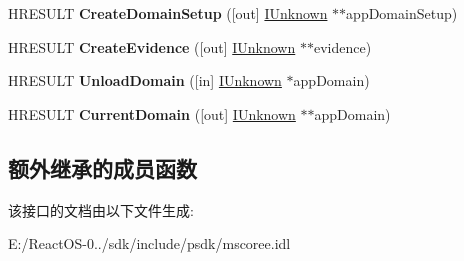 \begin{DoxyCompactItemize}
\item 
\mbox{\label{interface_i_cor_runtime_host_a9a3b87daafd1550ec6ad57dce939aab0}} 
H\+R\+E\+S\+U\+LT {\bfseries Create\+Domain\+Setup} (\mbox{[}out\mbox{]} \hyperlink{interface_i_unknown}{I\+Unknown} $\ast$$\ast$app\+Domain\+Setup)
\item 
\mbox{\label{interface_i_cor_runtime_host_a3a29d090136063897458db963f31489a}} 
H\+R\+E\+S\+U\+LT {\bfseries Create\+Evidence} (\mbox{[}out\mbox{]} \hyperlink{interface_i_unknown}{I\+Unknown} $\ast$$\ast$evidence)
\item 
\mbox{\label{interface_i_cor_runtime_host_ab30887d02569c83ae825a952adeb8304}} 
H\+R\+E\+S\+U\+LT {\bfseries Unload\+Domain} (\mbox{[}in\mbox{]} \hyperlink{interface_i_unknown}{I\+Unknown} $\ast$app\+Domain)
\item 
\mbox{\label{interface_i_cor_runtime_host_a49b72e08850090a5dceb5527e51838c8}} 
H\+R\+E\+S\+U\+LT {\bfseries Current\+Domain} (\mbox{[}out\mbox{]} \hyperlink{interface_i_unknown}{I\+Unknown} $\ast$$\ast$app\+Domain)
\end{DoxyCompactItemize}
\subsection*{额外继承的成员函数}


该接口的文档由以下文件生成\+:\begin{DoxyCompactItemize}
\item 
E\+:/\+React\+O\+S-\/0../sdk/include/psdk/mscoree.\+idl\end{DoxyCompactItemize}
